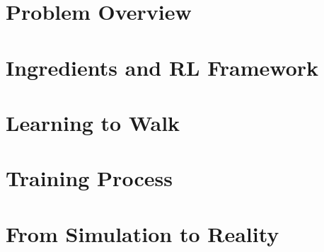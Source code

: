\documentclass[en,hazy5,blue,11pt,normal]{elegantnote}
\begin{document}
\section{Problem Overview}


\section{Ingredients and RL Framework}


\section{Learning to Walk}


\section{Training Process}


\section{From Simulation to Reality}

\end{document}
